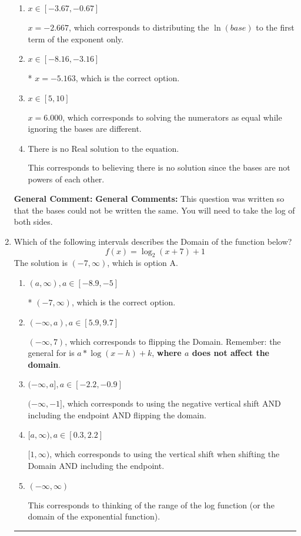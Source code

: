 \documentclass{extbook}[14pt]
\newcommand{\litem}[1]{\item #1

\rule{\textwidth}{0.4pt}}
\begin{document}
\begin{enumerate}
{\begin{enumerate}[label=\Alph*.]
$x = 11.614$, which corresponds to distributing the $\ln(base)$ to the second term of the exponent only.
\item \( x \in [-3.67, -0.67] \)

$x = -2.667$, which corresponds to distributing the $\ln(base)$ to the first term of the exponent only.
\item \( x \in [-8.16, -3.16] \)

* $x = -5.163$, which is the correct option.
\item \( x \in [5, 10] \)

$x = 6.000$, which corresponds to solving the numerators as equal while ignoring the bases are different.
\item \( \text{There is no Real solution to the equation.} \)

This corresponds to believing there is no solution since the bases are not powers of each other.
\end{enumerate}

\textbf{General Comment:} \textbf{General Comments:} This question was written so that the bases could not be written the same. You will need to take the log of both sides.
}
\litem{
Which of the following intervals describes the Domain of the function below?
\[ f(x) = \log_2{(x+7)}+1 \]The solution is \( (-7, \infty) \), which is option A.\begin{enumerate}[label=\Alph*.]
\item \( (a, \infty), a \in [-8.9, -5] \)

* $(-7, \infty)$, which is the correct option.
\item \( (-\infty, a), a \in [5.9, 9.7] \)

$(-\infty, 7)$, which corresponds to flipping the Domain. Remember: the general for is $a*\log(x-h)+k$, \textbf{where $a$ does not affect the domain}.
\item \( (-\infty, a], a \in [-2.2, -0.9] \)

$(-\infty, -1]$, which corresponds to using the negative vertical shift AND including the endpoint AND flipping the domain.
\item \( [a, \infty), a \in [0.3, 2.2] \)

$[1, \infty)$, which corresponds to using the vertical shift when shifting the Domain AND including the endpoint.
\item \( (-\infty, \infty) \)

This corresponds to thinking of the range of the log function (or the domain of the exponential function).
\end{enumerate}

}
\end{enumerate}
\end{document}

